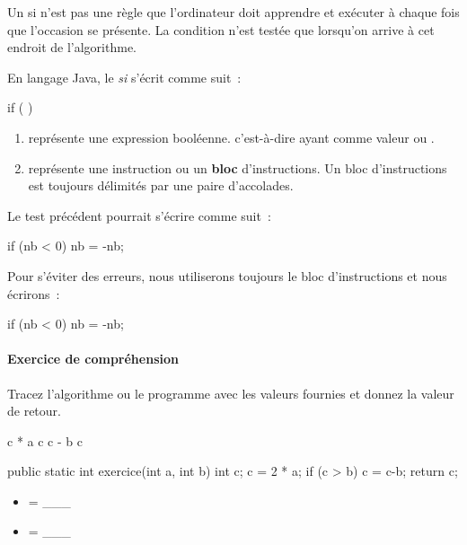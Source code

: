 	Un \og{}si\fg{} n’est pas une règle que l’ordinateur doit apprendre et
	exécuter à chaque fois que l’occasion se présente.  La condition n’est
	testée que lorsqu’on arrive à cet endroit de l’algorithme.
	
	En langage Java, le \emph{si} s'écrit comme suit~:

	\begin{grammaire}
		if (  ) 
	\end{grammaire}

	\begin{enumerate}
		\item {} représente une expression booléenne. 
			c'est-à-dire ayant comme valeur  ou .
		\item {} représente une instruction ou un 
			\textbf{bloc} d'instructions. Un bloc  d'instructions 
			est toujours délimités par une paire d'accolades. 
	\end{enumerate}

	Le test précédent pourrait s'écrire comme suit~:

	\begin{java}
if (nb < 0)
	nb = -nb;
	\end{java}

	Pour s'éviter des erreurs, nous utiliserons toujours le bloc d'instructions
	et nous écrirons~:

	\begin{java}
if (nb < 0){
	nb = -nb;
}
	\end{java}

	\begin{Emphase}
		\paragraph{Exercice de compréhension}
		Tracez  l'algorithme ou le programme avec les valeurs fournies et donnez
		la valeur de retour.
		
		\begin{pseudocode}
			\Let c  * a
				\Let c \Gets c - b
			\EndIf
			\Return c
		\EndAlgo
		\end{pseudocode}		
		
		\begin{java}
public static int exercice(int a, int b){
	int c;
	c = 2 * a;
	if (c > b){
		c = c-b;
	}
	return c;
}
		\end{java}
		
		\begin{multicols}{2}
		\begin{itemize}
		\item {} = \_\_\_
		\item {} = \_\_\_
		\end{itemize}
		\end{multicols}	
	\end{Emphase}



